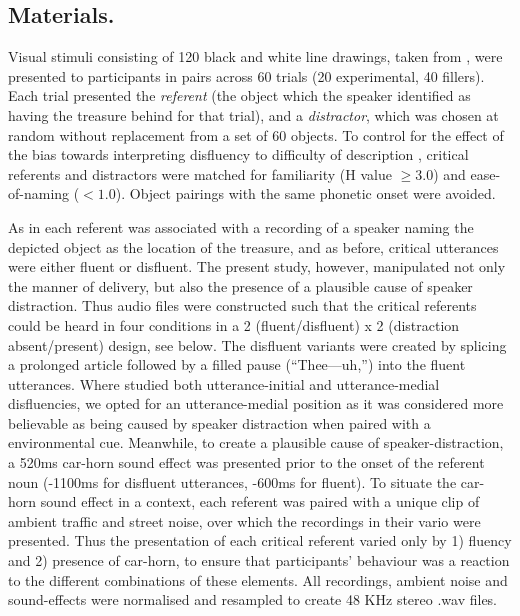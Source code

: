 \documentclass[a4paper,man,natbib]{apa6}
\newcommand*{\spex}[1]{``{#1}''} %
\begin{document}
\subsection{Materials.}
Visual stimuli consisting of 120 black and white line drawings, taken from \citet{Snodgrass1980}, were presented to participants in pairs across 60 trials (20 experimental, 40 fillers). 
Each trial presented the \textit{referent} (the object which the speaker identified as having the treasure behind for that trial), and a \textit{distractor}, which was chosen at random without replacement from a set of 60 objects. 
To control for the effect of the bias towards interpreting disfluency to difficulty of description \citep{Arnold2007}, critical referents and distractors were matched for familiarity (H value $\ge 3.0$) and ease-of-naming ($<1.0$). 
Object pairings with the same phonetic onset were avoided. 

As in \citet{Loy2016} each referent was associated with a recording of a speaker naming the depicted object as the location of the treasure, and as before, critical utterances were either fluent or disfluent. 
The present study, however, manipulated not only the manner of delivery, but also the presence of a plausible cause of speaker distraction. 
Thus audio files were constructed such that the critical referents could be heard in four conditions in a 2 (fluent/disfluent) x 2 (distraction absent/present) design, see below. 
The disfluent variants were created by splicing a prolonged article followed by a filled pause (\spex{Thee---uh,}) into the fluent utterances.
Where \citet{Loy2016} studied both utterance-initial and utterance-medial disfluencies, we opted for an utterance-medial position as it was considered more believable as being caused by speaker distraction when paired with a environmental cue.
Meanwhile, to create a plausible cause of speaker-distraction, a 520ms car-horn sound effect was presented prior to the onset of the referent noun (-1100ms for disfluent utterances, -600ms for fluent). 
To situate the car-horn sound effect in a context, each referent was paired with a unique clip of ambient traffic and street noise, over which the recordings in their vario were presented.
Thus the presentation of each critical referent varied only by 1) fluency and 2) presence of car-horn, to ensure that participants' behaviour was a reaction to the different combinations of these elements. 
All recordings, ambient noise and sound-effects were normalised and resampled to create 48 KHz stereo .wav files.
\end{document}

